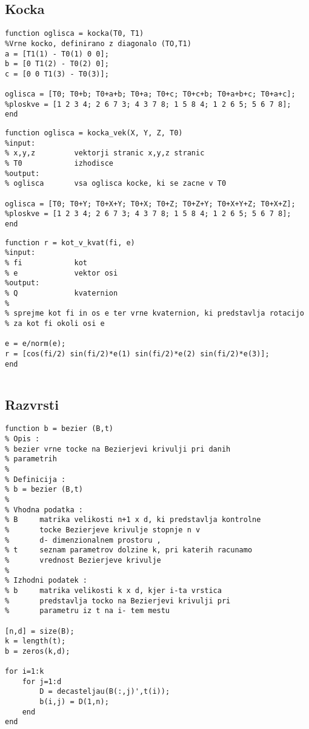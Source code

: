 \documentclass[12pt,a4paper,twoside]{article}
\theoremstyle{definition} %
\theoremstyle{plain} %
\numberwithin{equation}{section}  %
\begin{document}
\subsection{Kocka}

\begin{lstlisting}[caption = {kocka}]
function oglisca = kocka(T0, T1)
%Vrne kocko, definirano z diagonalo (TO,T1)
a = [T1(1) - T0(1) 0 0];
b = [0 T1(2) - T0(2) 0];
c = [0 0 T1(3) - T0(3)];

oglisca = [T0; T0+b; T0+a+b; T0+a; T0+c; T0+c+b; T0+a+b+c; T0+a+c];
%ploskve = [1 2 3 4; 2 6 7 3; 4 3 7 8; 1 5 8 4; 1 2 6 5; 5 6 7 8]; 
end
\end{lstlisting}

\begin{lstlisting}[caption = {kocka\_vek}]
function oglisca = kocka_vek(X, Y, Z, T0)
%input:
% x,y,z         vektorji stranic x,y,z stranic
% T0            izhodisce
%output:
% oglisca       vsa oglisca kocke, ki se zacne v T0

oglisca = [T0; T0+Y; T0+X+Y; T0+X; T0+Z; T0+Z+Y; T0+X+Y+Z; T0+X+Z];
%ploskve = [1 2 3 4; 2 6 7 3; 4 3 7 8; 1 5 8 4; 1 2 6 5; 5 6 7 8]; 
end
\end{lstlisting}

\begin{lstlisting}[caption = {kot\_v\_kvat}]
function r = kot_v_kvat(fi, e)
%input:
% fi            kot
% e             vektor osi
%output:
% Q             kvaternion
%
% sprejme kot fi in os e ter vrne kvaternion, ki predstavlja rotacijo 
% za kot fi okoli osi e

e = e/norm(e);
r = [cos(fi/2) sin(fi/2)*e(1) sin(fi/2)*e(2) sin(fi/2)*e(3)];
end
\end{lstlisting}

\begin{lstlisting}[caption = {}]

\end{lstlisting}


\subsection{Razvrsti}

\begin{lstlisting}[caption = {}]
function b = bezier (B,t)
% Opis :
% bezier vrne tocke na Bezierjevi krivulji pri danih
% parametrih
%
% Definicija :
% b = bezier (B,t)
%
% Vhodna podatka :
% B     matrika velikosti n+1 x d, ki predstavlja kontrolne
%       tocke Bezierjeve krivulje stopnje n v
%       d- dimenzionalnem prostoru ,
% t     seznam parametrov dolzine k, pri katerih racunamo
%       vrednost Bezierjeve krivulje
%
% Izhodni podatek :
% b     matrika velikosti k x d, kjer i-ta vrstica
%       predstavlja tocko na Bezierjevi krivulji pri
%       parametru iz t na i- tem mestu

[n,d] = size(B);
k = length(t);
b = zeros(k,d);

for i=1:k
    for j=1:d
        D = decasteljau(B(:,j)',t(i));
        b(i,j) = D(1,n);
    end
end
\end{lstlisting}
\end{document}
